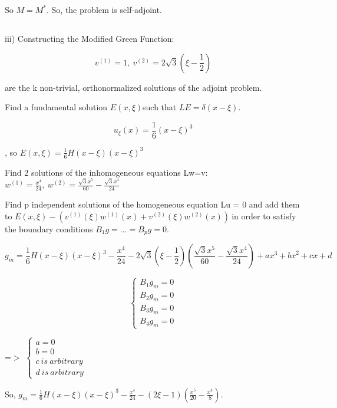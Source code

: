 \documentclass{article}
\begin{document}
So $M=M^*$. So, the problem is self-adjoint.
\subsection{}
iii) Constructing the Modified Green Function:

{\raggedright


\[
v^{\left(1\right)}=1,\ v^{\left(2\right)}=2\sqrt{3}(\xi{}-\frac{1}{2})
\]

are the k non-trivial, orthonormalized solutions of the adjoint problem.
}

{\raggedright
Find a fundamental solution $E\left(x,\xi{}\right)$such that
$LE=\delta{}(x-\xi{})$.
}

{\raggedright


\[
u_{\xi{}}\left(x\right)=\frac{1}{6}{\left(x-\xi{}\right)}^3
\]

, so $E\left(x,\xi{}\right)=\frac{1}{6}{H(x-\xi{})\left(x-\xi{}\right)}^3$
}

{\raggedright
Find 2 solutions of the inhomogeneous equations Lw=v:
$w^{\left(1\right)}=\frac{x^4}{24},\
w^{(2)}=\frac{\sqrt{3}x^5}{60}-\frac{\sqrt{3}x^4}{24}$
}

{\raggedright
Find p independent solutions of the homogeneous equation Lu = 0 and add them to
$E\left(x,\xi{}\right)-\left(v^{\left(1\right)}\left(\xi{}\right)w^{\left(1\right)}\left(x\right)+v^{\left(2\right)}\left(\xi{}\right)w^{\left(2\right)}\left(x\right)\right)\
$in order to satisfy the boundary conditions $B_1g=…=B_pg=0$.
}


\[
g_m=\frac{1}{6}{H\left(x-\xi{}\right)\left(x-\xi{}\right)}^3-\frac{x^4}{24}-2\sqrt{3}\left(\xi{}-\frac{1}{2}\right)\left(\frac{\sqrt{3}x^5}{60}-\frac{\sqrt{3}x^4}{24}\right)+{ax}^3+{bx}^2+cx+d
\]


{\raggedright


\[
\left\{\begin{array}{l}B_1g_m=0 \\
B_2g_m=0 \\
B_3g_m=0 \\
B_4g_m=0\end{array}\right.
\]

=$>$ $\left\{\begin{array}{l}a=0 \\
b=0 \\
c\ is\ arbitrary \\
d\ is\ arbitrary\end{array}\right.$
}

{\raggedright
So,
$g_m=\frac{1}{6}{H\left(x-\xi{}\right)\left(x-\xi{}\right)}^3-\frac{x^4}{24}-\left(2\xi{}-1\right)\left(\frac{x^5}{20}-\frac{x^4}{8}\right)$.
}
\end{document}
